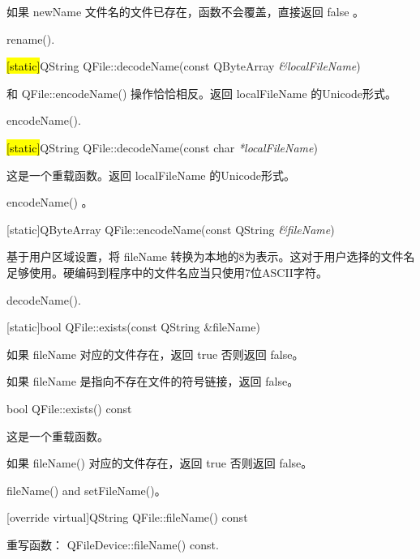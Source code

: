 \begin{notice}
如果 newName 文件名的文件已存在，函数不会覆盖，直接返回 false 。
\end{notice} 

\begin{seeAlso}
rename().
\end{seeAlso} 

\hl{[static]}QString QFile::decodeName(const QByteArray \emph{\&localFileName})

和 QFile::encodeName() 操作恰恰相反。返回 localFileName 的Unicode形式。


\begin{seeAlso}
encodeName().
\end{seeAlso} 

\hl{[static]}QString QFile::decodeName(const char \emph{*localFileName})

这是一个重载函数。返回 localFileName 的Unicode形式。


\begin{seeAlso}
 encodeName() 。
\end{seeAlso} 


[static]QByteArray QFile::encodeName(const QString \emph{\&fileName})

基于用户区域设置，将 fileName 转换为本地的8为表示。这对于用户选择的文件名足够使用。硬编码到程序中的文件名应当只使用7位ASCII字符。


\begin{seeAlso}
decodeName().
\end{seeAlso} 

[static]bool QFile::exists(const QString \&fileName)

如果 fileName 对应的文件存在，返回 true 否则返回 false。



\begin{notice}
如果 fileName 是指向不存在文件的符号链接，返回 false。
\end{notice} 

bool QFile::exists() const

这是一个重载函数。

如果 fileName() 对应的文件存在，返回 true 否则返回 false。



\begin{seeAlso}
fileName() and setFileName()。
\end{seeAlso} 

[override virtual]QString QFile::fileName() const

重写函数： QFileDevice::fileName() const.

